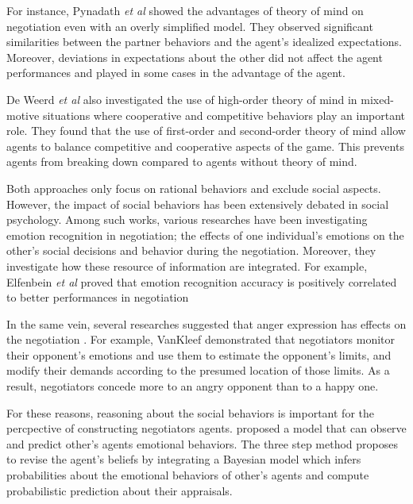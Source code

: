 \documentclass[sigconf]{aamas}  %
\begin{document}
	For instance, Pynadath \textit{et al}\cite{pynadath2013you} showed the advantages of theory of mind on negotiation even with an overly simplified model. They observed significant similarities between	the partner behaviors and the agent's idealized expectations. Moreover, deviations in expectations about the other did not affect the agent performances and played in some cases in the advantage of the agent.
	
	De Weerd \textit{et al} \cite{de2013higher} also investigated the use of high-order theory of mind in mixed-motive situations where cooperative and competitive behaviors play an important role. They found that the use of first-order and second-order theory of mind allow agents to balance competitive and cooperative	aspects of the game. This prevents agents from breaking down compared to  agents without theory of mind.
	
	
	Both approaches only focus on rational behaviors and exclude social aspects. However, the impact of social behaviors has been extensively debated in social psychology. Among such works, various researches have been investigating emotion recognition in negotiation; the effects of one individual's	emotions on the other's social decisions and behavior during the negotiation. Moreover, they investigate how these resource of information are integrated.
	For example, Elfenbein\textit{ et al} \cite{elfenbein2007reading} proved that  emotion recognition accuracy is positively correlated to  better performances in negotiation
	
	In the same vein, several researches suggested that anger expression has effects on the negotiation \cite{sinaceur2006get,van2010interpersonal,ferguson2004social}. For example, VanKleef \cite{van2004interpersonal} demonstrated that negotiators monitor their opponent's emotions and use them to estimate the opponent's limits, and modify their demands according to the presumed location of those limits. As a result, negotiators concede more to an angry opponent than to a happy one. 
	
	
	For these reasons, reasoning about the social behaviors is important for the percpective of constructing negotiators agents. \cite{alfonso2015emotional} proposed a model that can observe and predict other's agents emotional behaviors. The three step method proposes to revise the agent's  beliefs by integrating a Bayesian model which infers probabilities about the emotional behaviors of other's agents and compute probabilistic prediction about their appraisals.
	
\end{document}
